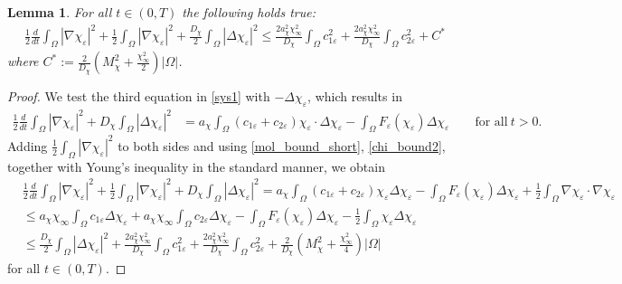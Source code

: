 \documentclass[a4paper,10pt]{article}
\newtheorem{Lemma}[Theorem]{Lemma}
\theoremstyle{definition}
\begin{document}
\begin{Lemma}
    \label{chi_lemma1}
    For all $t \in (0, T)$ the following holds true:
    \begin{align}
        \label{chi_ent}
    \frac{1}{2}\frac{d}{dt}\int_\Omega |\nabla \chi_\varepsilon|^2 + \frac{1}{2} \int_\Omega |\nabla \chi_\varepsilon|^2 + \frac{D_\chi}{2} \int_\Omega |\Delta \chi_\varepsilon|^2  \leq \frac{2a_\chi^2\chi_\infty^2}{D_\chi}\int_\Omega c_{1\varepsilon}^2 + \frac{2a_\chi^2\chi_\infty^2}{D_\chi}\int_\Omega c_{2\varepsilon}^2 + C^\ast
    \end{align}
    where $C^\ast := \frac{2}{D_\chi}\left(M_\chi^2 + \frac{\chi_\infty^2}{2}\right)|\Omega|$.
\end{Lemma}
\begin{proof}
    We test the third equation in \eqref{sys1} with $- \Delta \chi_\varepsilon$, which results in
    \begin{align*}
         \frac{1}{2}\frac{d}{dt}\int_\Omega |\nabla \chi_\varepsilon|^2 + D_\chi \int_\Omega |\Delta \chi_\varepsilon|^2  & = a_\chi \int_\Omega (c_{1\varepsilon} + c_{2\varepsilon}) \chi_\varepsilon \cdot \Delta \chi_\varepsilon - \int_\Omega F_\varepsilon(\chi_\varepsilon) \Delta \chi_\varepsilon \qquad \text{for all}~ t > 0.
    \end{align*}
    Adding $\tfrac{1}{2}\int_\Omega |\nabla \chi_\varepsilon|^2$ to both sides and using \eqref{mol_bound_short}, \eqref{chi_bound2}, together with Young's inequality in the standard manner, we obtain
    \begin{align*}
    & \frac{1}{2}\frac{d}{dt}\int_\Omega |\nabla \chi_\varepsilon|^2 + \frac{1}{2}\int_\Omega |\nabla \chi_\varepsilon|^2 + D_\chi \int_\Omega |\Delta \chi_\varepsilon|^2 = a_\chi \int_\Omega (c_{1\varepsilon} + c_{2\varepsilon}) \chi_\varepsilon \Delta \chi_\varepsilon -\int_\Omega F_\varepsilon(\chi_\varepsilon) \Delta \chi_\varepsilon + \frac{1}{2} \int_\Omega \nabla \chi_\varepsilon \cdot \nabla \chi_\varepsilon \\[5pt]
    & \leq a_\chi \chi_\infty \int_\Omega c_{1\varepsilon} \Delta \chi_\varepsilon + a_\chi \chi_\infty \int_\Omega c_{2\varepsilon} \Delta \chi_\varepsilon -  \int_\Omega F_\varepsilon(\chi_\varepsilon)\Delta \chi_\varepsilon - \frac{1}{2}\int_\Omega \chi_\varepsilon \Delta \chi_\varepsilon \\[5pt]
    & \leq \frac{D_\chi}{2} \int_\Omega |\Delta \chi_\varepsilon|^2 + \frac{2a_\chi^2\chi_\infty^2}{D_\chi}\int_\Omega c_{1\varepsilon}^2 + \frac{2a_\chi^2\chi_\infty^2}{D_\chi}\int_\Omega c_{2\varepsilon}^2 + \frac{2}{D_\chi}\left(M_\chi^2 + \frac{\chi_\infty^2}{4}\right)|\Omega|
    \end{align*}
 for all $t \in (0, T)$.
\end{proof}
\end{document}
